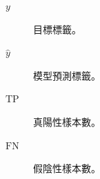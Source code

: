 \clearpage
{}
\begin{description}
\item[$y$] 目標標籤。
\item[$\hat y$] 模型預測標籤。
\item[$\mathrm{TP}$] 真陽性樣本數。
\item[$\mathrm{FN}$] 假陰性樣本數。
\end{description}

